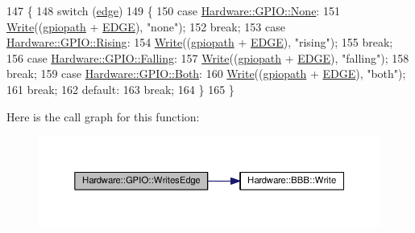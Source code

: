 \begin{DoxyCode}
147     \{
148         \textcolor{keywordflow}{switch} (\hyperlink{class_hardware_1_1_g_p_i_o_adf15f74f053069029e99934e28c109e0}{edge})
149         \{
150         \textcolor{keywordflow}{case} \hyperlink{class_hardware_1_1_g_p_i_o_a9a7595aabdac9aec75f22e8b86342162aa49ebde2bcdeefb0e7be23fd0fbbdee6}{Hardware::GPIO::None}:
151             \hyperlink{class_hardware_1_1_b_b_b_a155cc06f76d82a6b690ce5ea08e7c68e}{Write}((\hyperlink{class_hardware_1_1_g_p_i_o_ac47062ed6aba52b9e8506e1575bf5061}{gpiopath} + \hyperlink{_g_p_i_o_8h_ac243bfa96aa2c28014159ff098bd2324}{EDGE}), \textcolor{stringliteral}{"none"});
152             \textcolor{keywordflow}{break};
153         \textcolor{keywordflow}{case} \hyperlink{class_hardware_1_1_g_p_i_o_a9a7595aabdac9aec75f22e8b86342162afbb0aadc6c0311beb25d5a056c61ed46}{Hardware::GPIO::Rising}:
154             \hyperlink{class_hardware_1_1_b_b_b_a155cc06f76d82a6b690ce5ea08e7c68e}{Write}((\hyperlink{class_hardware_1_1_g_p_i_o_ac47062ed6aba52b9e8506e1575bf5061}{gpiopath} + \hyperlink{_g_p_i_o_8h_ac243bfa96aa2c28014159ff098bd2324}{EDGE}), \textcolor{stringliteral}{"rising"});
155             \textcolor{keywordflow}{break};
156         \textcolor{keywordflow}{case} \hyperlink{class_hardware_1_1_g_p_i_o_a9a7595aabdac9aec75f22e8b86342162a0db6d4392aec905f4fd0576c2cba9279}{Hardware::GPIO::Falling}:
157             \hyperlink{class_hardware_1_1_b_b_b_a155cc06f76d82a6b690ce5ea08e7c68e}{Write}((\hyperlink{class_hardware_1_1_g_p_i_o_ac47062ed6aba52b9e8506e1575bf5061}{gpiopath} + \hyperlink{_g_p_i_o_8h_ac243bfa96aa2c28014159ff098bd2324}{EDGE}), \textcolor{stringliteral}{"falling"});
158             \textcolor{keywordflow}{break};
159         \textcolor{keywordflow}{case} \hyperlink{class_hardware_1_1_g_p_i_o_a9a7595aabdac9aec75f22e8b86342162aa6f3d9102e894c4bf553a679ad2148c3}{Hardware::GPIO::Both}:
160             \hyperlink{class_hardware_1_1_b_b_b_a155cc06f76d82a6b690ce5ea08e7c68e}{Write}((\hyperlink{class_hardware_1_1_g_p_i_o_ac47062ed6aba52b9e8506e1575bf5061}{gpiopath} + \hyperlink{_g_p_i_o_8h_ac243bfa96aa2c28014159ff098bd2324}{EDGE}), \textcolor{stringliteral}{"both"});
161             \textcolor{keywordflow}{break};
162         \textcolor{keywordflow}{default}:
163             \textcolor{keywordflow}{break};
164         \}
165     \}
\end{DoxyCode}


Here is the call graph for this function\+:\nopagebreak
\begin{figure}[H]
\begin{center}
\leavevmode
\includegraphics[width=350pt]{class_hardware_1_1_g_p_i_o_a99e41223fcd93f47f3acf4851fc32de2_cgraph}
\end{center}
\end{figure}




